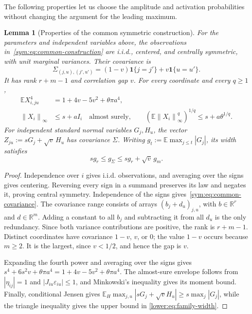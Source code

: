 \documentclass[11pt,letterpaper]{article}
\newenvironment{vSixBlock}{\color{magenta}}{}
\newtheorem{lemma}{Lemma}
\theoremstyle{remark}
\newcommand{\E}{\mathbb E}
\newcommand{\R}{\mathbb R}
\newcommand{\norm}[1]{\left\lVert#1\right\rVert}
\newcommand{\ind}{\mathbf 1}
\begin{document}
\begin{vSixBlock}
The following properties let us choose the amplitude and activation
probabilities without changing the argument for the leading maximum.
\begin{lemma}[Properties of the common symmetric construction]
\label{lower:family-properties}
For the parameters and independent variables above, the observations
in~\eqref{sym:eq:common-construction} are i.i.d., centered, and
centrally symmetric, with unit marginal variances. Their covariance is
\begin{equation}
 \Sigma_{(j,u),(j',u')}=(1-v)\ind\{j=j'\}+v\ind\{u=u'\}.
 \label{sym:eq:common-covariance}
\end{equation}
It has rank \(r+m-1\) and correlation gap \(v\). For every
coordinate and every \(q\ge1\),
\begin{align}
 \E X_{i,ju}^4
 &=1+4v-5v^2+\theta\pi a^4,
 \label{lower:eq:family-fourth}\\
 \norm{X_i}_\infty&\le s+aI_i\quad\text{almost surely},\qquad
 (\E\norm{X_i}_\infty^q)^{1/q}\le s+a\theta^{1/q}.
 \label{lower:eq:family-envelope}
\end{align}
For independent standard normal variables \(G_j,H_u\), the vector
\(Z_{ju}:=sG_j+\sqrt v\,H_u\) has covariance \(\Sigma\).
Writing \(g_t:=\E\max_{j\le t}|G_j|\), its width satisfies
\begin{equation}
 s g_r\le g_\Sigma\le s g_r+\sqrt v\,g_m.
 \label{lower:eq:family-width}
\end{equation}
\end{lemma}

\begin{proof}
Independence over \(i\) gives i.i.d. observations, and averaging
over the signs gives centering. Reversing every sign in a summand
preserves its law and negates it, proving central symmetry.
Independence of the signs gives~\eqref{sym:eq:common-covariance}.
The covariance range consists of arrays \((b_j+d_u)_{j,u}\),
with \(b\in\R^r\) and \(d\in\R^m\). Adding a constant to
all \(b_j\) and subtracting it from all \(d_u\) is the only
redundancy. Since both variance contributions are positive, the rank
is \(r+m-1\). Distinct coordinates have covariance \(1-v\),
\(v\), or \(0\); the value \(1-v\) occurs because \(m\ge2\).
It is the largest, since \(v<1/2\), and hence the gap is \(v\).

Expanding the fourth power and averaging over the signs gives
\(s^4+6s^2v+\theta\pi a^4=1+4v-5v^2+\theta\pi a^4\).
The almost-sure envelope follows from
\(|\eta_{ij}|=1\) and \(|J_{iu}\varepsilon_{iu}|\le1\),
and Minkowski's inequality gives its moment bound. Finally,
conditional Jensen gives
\(\E_H\max_{j,u}|sG_j+\sqrt v H_u|\ge s\max_j|G_j|\),
while the triangle inequality gives the upper bound in
\eqref{lower:eq:family-width}.
\end{proof}


\end{vSixBlock}
\end{document}
